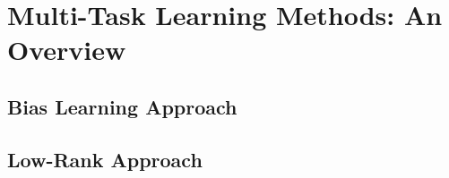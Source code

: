 

\section{Multi-Task Learning Methods: An Overview}

\subsection{Bias Learning Approach}



\subsection{Low-Rank Approach}






